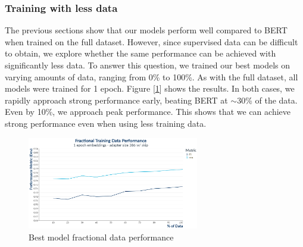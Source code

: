 \subsubsection{Training with less data}
The previous sections show that our models perform well compared to BERT when trained on the full dataset. However, since supervised data can be difficult to obtain, we explore whether the same performance can be achieved with significantly less data. To answer this question, we trained our best models on varying amounts of data, ranging from 0\% to 100\%. As with the full dataset, all models were trained for 1 epoch. Figure [\ref{fig:1_epoch_embeddings__adapter_386_with_skip}] shows the results. In both cases, we rapidly approach strong performance early, beating BERT at $\sim$30\% of the data. Even by 10\%, we approach peak performance. This shows that we can achieve strong performance even when using less training data. 

\begin{figure}[ht]
	\centering
	\includegraphics[width=7.5cm]{images/1_Epoch_Embeddings__Adapter_386_with_Skip.png}
	\caption{\label{fig:1_epoch_embeddings__adapter_386_with_skip}Best model fractional data performance}
\end{figure}

